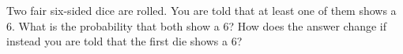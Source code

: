Two fair six-sided dice are rolled. You are told that at least one of them shows a $6$. What is the probability that both show a $6$? How does the answer change if instead you are told that the first die shows a $6$?
